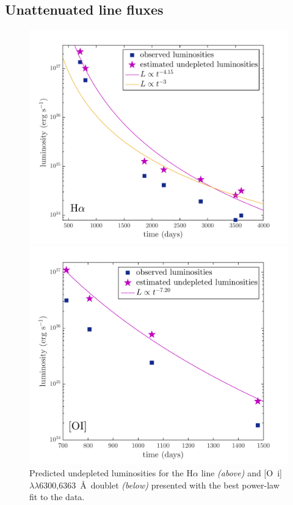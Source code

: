 \subsection{Unattenuated line fluxes}

\begin{figure}
\centering
\includegraphics[clip=true,scale=0.6]{chapters/chapter5/images/undep_fluxes_Ha.pdf}

\includegraphics[clip=true,scale=0.6]{chapters/chapter5/images/undep_lum_OI.pdf}
\caption{Predicted undepleted luminosities for the H$\alpha$ line 
\textit{(above)} and [O~{\sc i}]$\lambda\lambda$6300,6363~\AA\ doublet 
\textit{(below)} presented with the best power-law fit to the data.}
\label{undep}
\end{figure}

